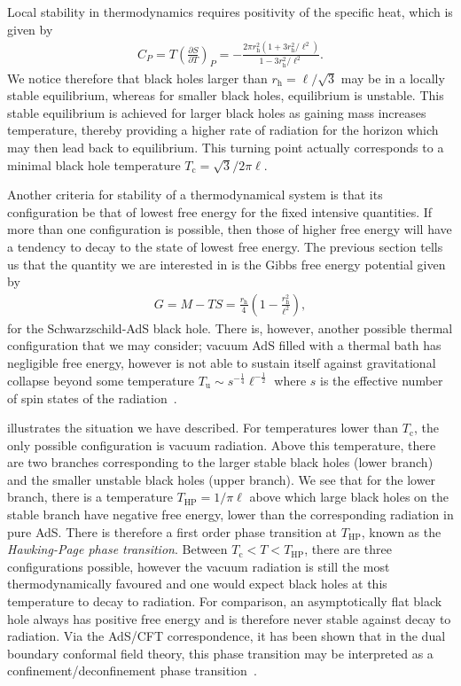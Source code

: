 \documentclass[
twoside,
openright,
frontopenright,
]{dmathesis}
\begin{document}
Local stability in thermodynamics requires positivity of the specific heat,
which is given by
\begin{align}
  C_P = T \left(\frac{\partial S}{\partial T}\right)_P =
  -\frac{2\pi r_\mathrm{h}^2(1+3r_\mathrm{h}^2/\ell^2)}{1-3r_\mathrm{h}^2/\ell^2} .
\end{align}
We notice therefore that black holes larger than $r_\mathrm{h} = \ell/\sqrt{3}$
may be in a locally stable equilibrium, whereas for smaller black holes,
equilibrium is unstable. This stable equilibrium is achieved for larger black
holes as gaining mass increases temperature, thereby providing a higher rate of
radiation for the horizon which may then lead back to equilibrium. This turning
point actually corresponds to a minimal black hole temperature
$T_\mathrm{c} = \sqrt{3}/2\pi\ell$.

Another criteria for stability of a thermodynamical system is that its
configuration be that of lowest free energy for the fixed intensive
quantities. If more than one configuration is possible, then those of higher
free energy will have a tendency to decay to the state of lowest free
energy. The previous section tells us that the quantity we are interested in is
the Gibbs free energy potential given by
\begin{align}
  G = M - TS = \frac{r_\mathrm{h}}{4}\left(1-\frac{r_\mathrm{h}^2}{\ell^2}\right),
\end{align}
for the Schwarzschild-AdS black hole. There is, however, another possible
thermal configuration that we may consider; vacuum AdS filled with a
thermal bath has negligible free energy, however is not able to sustain
itself against gravitational collapse beyond some temperature
$T_\mathrm{u} \sim s^{-\frac14} \ell^{-\frac12}$ where $s$ is the effective
number of spin states of the radiation~\cite{Hawking:1982dh}.

 illustrates the situation we have described. For
temperatures lower than $T_\mathrm{c}$, the only possible configuration is
vacuum radiation. Above this temperature, there are two branches corresponding
to the larger stable black holes (lower branch) and the smaller unstable black
holes (upper branch). We see that for the lower branch, there is a temperature
$T_\mathrm{HP} = 1/\pi\ell$ above which large black holes on the stable branch
have negative free energy, lower than the corresponding radiation in pure
AdS. There is therefore a first order phase transition at $T_\mathrm{HP}$, known
as the \emph{Hawking-Page phase transition}. Between
$T_\mathrm{c}<T<T_\mathrm{HP}$, there are three configurations possible, however
the vacuum radiation is still the most thermodynamically favoured and one would
expect black holes at this temperature to decay to radiation. For comparison, an
asymptotically flat black hole always has positive free energy and is therefore
never stable against decay to radiation. Via the AdS/CFT correspondence, it has
been shown that in the dual boundary conformal field theory, this phase
transition may be interpreted as a confinement/deconfinement phase
transition~\cite{Witten:1998zw}.
\end{document}
